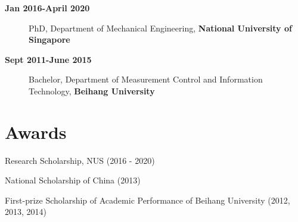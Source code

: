\documentclass[a4paper,12pt]{article} %
\begin{document}
\begin{description}
\item[\textbf{ Jan 2016-April 2020}] PhD, Department of Mechanical Engineering, \textbf{National University of Singapore}
\item[\textbf{ Sept 2011-June 2015}] Bachelor, Department of Measurement Control and Information Technology, \textbf{Beihang University}
\end{description}


\section{Awards}
\begin{description}
	\setlength\itemsep{-0.15em}
	\item Research Scholarship, NUS (2016 - 2020)
	\item National Scholarship of China (2013)
	\item First-prize Scholarship of Academic Performance of Beihang University (2012, 2013, 2014)
\end{description}
\end{document}
